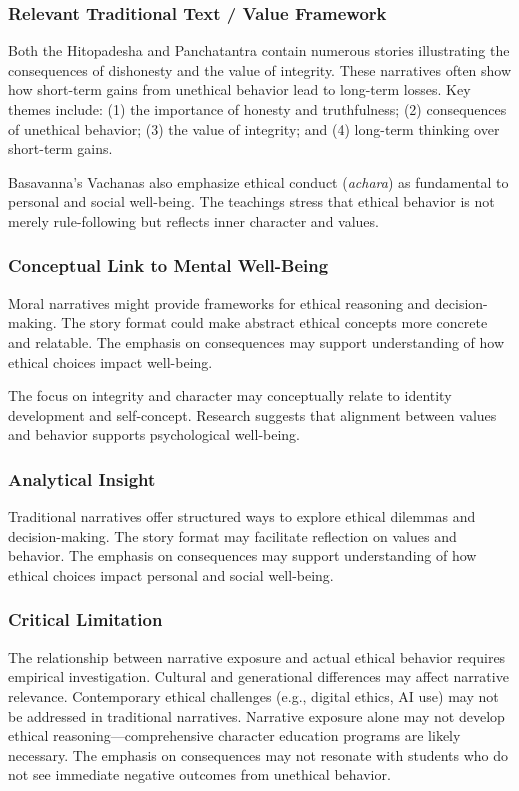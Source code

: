 \documentclass[12pt,a4paper,twocolumn]{article}
\begin{document}
\subsubsection{Relevant Traditional Text / Value Framework}

Both the Hitopadesha and Panchatantra contain numerous stories illustrating the consequences of dishonesty and the value of integrity. These narratives often show how short-term gains from unethical behavior lead to long-term losses. Key themes include: (1) the importance of honesty and truthfulness; (2) consequences of unethical behavior; (3) the value of integrity; and (4) long-term thinking over short-term gains.

Basavanna's Vachanas also emphasize ethical conduct (\textit{achara}) as fundamental to personal and social well-being. The teachings stress that ethical behavior is not merely rule-following but reflects inner character and values.

\subsubsection{Conceptual Link to Mental Well-Being}

Moral narratives might provide frameworks for ethical reasoning and decision-making. The story format could make abstract ethical concepts more concrete and relatable. The emphasis on consequences may support understanding of how ethical choices impact well-being.

The focus on integrity and character may conceptually relate to identity development and self-concept. Research suggests that alignment between values and behavior supports psychological well-being.

\subsubsection{Analytical Insight}

Traditional narratives offer structured ways to explore ethical dilemmas and decision-making. The story format may facilitate reflection on values and behavior. The emphasis on consequences may support understanding of how ethical choices impact personal and social well-being.

\subsubsection{Critical Limitation}

The relationship between narrative exposure and actual ethical behavior requires empirical investigation. Cultural and generational differences may affect narrative relevance. Contemporary ethical challenges (e.g., digital ethics, AI use) may not be addressed in traditional narratives. Narrative exposure alone may not develop ethical reasoning—comprehensive character education programs are likely necessary. The emphasis on consequences may not resonate with students who do not see immediate negative outcomes from unethical behavior.
\end{document}
